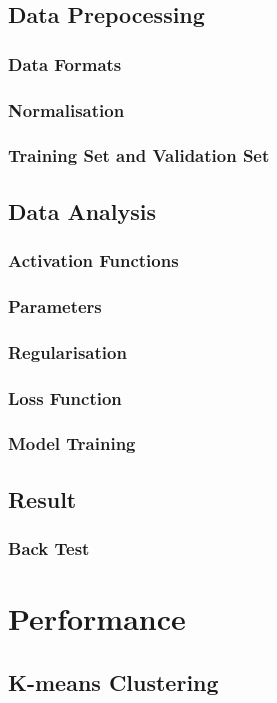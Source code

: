 \documentclass[11pt]{article} %
\theoremstyle{plain}
\theoremstyle{definition}
\begin{document}
\subsection{Data Prepocessing}
\subsubsection{Data Formats}
\subsubsection{Normalisation}
\subsubsection{Training Set and Validation Set}
\subsection{Data Analysis}
\subsubsection{Activation Functions}
\subsubsection{Parameters}
\subsubsection{Regularisation}
\subsubsection{Loss Function}
\subsubsection{Model Training}
\subsection{Result}
\subsubsection{Back Test}

\section{Performance}
\subsection{K-means Clustering}
\end{document}

